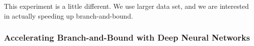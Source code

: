 \documentclass[10pt]{article} %
\theoremstyle{plain}
\theoremstyle{definition}
\theoremstyle{remark}
\begin{document}
This experiment is a little different. We use larger data set, and we are interested in actually speeding up branch-and-bound.

\subsubsection*{Accelerating Branch-and-Bound with Deep Neural Networks}






\end{document}
